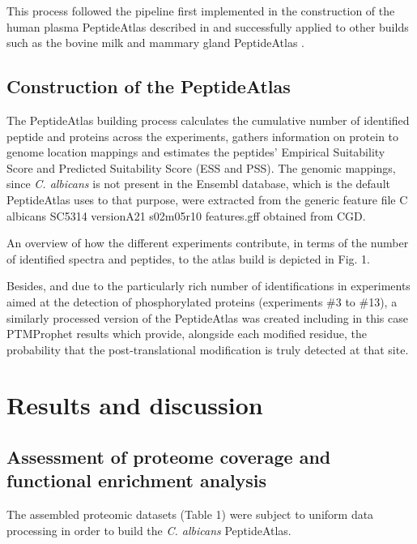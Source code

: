 This process followed the pipeline first implemented in the
construction of the human plasma PeptideAtlas described in
\citep{Farrah2011} and successfully applied to other builds such as the
bovine milk and mammary gland PeptideAtlas \citep{Bislev2012}.


\subsection*{Construction of the PeptideAtlas}

The PeptideAtlas building process calculates the cumulative
number of identified peptide and proteins across the experiments,
 gathers information on protein to genome location
mappings and estimates the peptides' Empirical Suitability
Score and Predicted Suitability Score (ESS and PSS). The genomic
mappings, since \textit{C. albicans} is not present in the Ensembl database,
 which is the default PeptideAtlas uses to that purpose, were
extracted from the generic feature file 
C albicans SC5314 versionA21 s02m05r10 features.gff
obtained from CGD.

An overview of how the different experiments contribute,
in terms of the number of identified spectra and peptides, to
the atlas build is depicted in Fig. 1.

Besides, and due to the particularly rich number of identifications
 in experiments aimed at the detection of phosphorylated proteins
  (experiments \#3 to \#13), a similarly processed
version of the PeptideAtlas was created including in this case
PTMProphet results which provide, alongside each modified
residue, the probability that the post-translational modification
is truly detected at that site.





\section*{Results and discussion}

\subsection*{Assessment of proteome coverage and functional enrichment analysis}

The assembled proteomic datasets (Table 1) were subject to
uniform data processing in order to build the \textit{C. albicans}
PeptideAtlas. 

